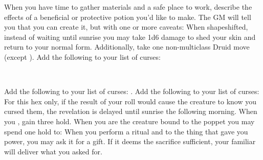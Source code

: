 \documentclass[darkmode]{dw_playbook}
\begin{document}
    {
            {When you have time to gather materials and a safe place to work, describe the effects of a beneficial or protective potion you’d like to make.  The GM will tell you that you can create it, but with one or more caveats:
            \gapSm
            \gapSm
            \gapSm
            \gapSm
            }
        \gap
            {
            When shapeshifted, instead of waiting until sunrise you may take 1d6 damage to shed your skin and return to your normal form.  Additionally, take one non-multiclass Druid move (except ).}
        \gap
            {Add the following to your list of curses:
            \gapSm
            }
    }

\clearpage
~

\pageThree
    {
        \advancedMovesCont
    }
    {
            {
            Add the following to your list of curses:
            \gapSm
            .
            \gapSm
            }
        \gap
            {Add the following to your list of curses:
            \gapSm
            \gap
            For this hex only, if the result of your roll would cause the creature to know you cursed them, the revelation is delayed until sunrise the following morning.}
        \gap
            {
            When you , gain three hold.  When you are  the creature bound to the poppet you may spend one hold to:
            \gapSm
            \gapSm
            }
        \gap
            {When you perform a ritual and  to the thing that gave you power, you may ask it for a gift.  If it deems the sacrifice sufficient, your familiar will deliver what you asked for.}
    }
    {
        ~
    }
\end{document}
